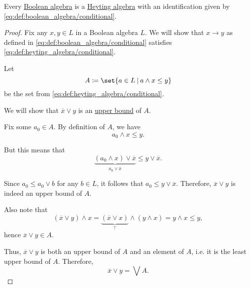 \begin{proposition}\label{thm:boolean_algebras_are_heyting_algebras}
  Every \hyperref[def:boolean_algebra]{Boolean algebra} is a \hyperref[def:heyting_algebra]{Heyting algebra} with an identification given by \eqref{eq:def:boolean_algebra/conditional}.
\end{proposition}
\begin{proof}
  Fix any \( x, y \in L \) in a Boolean algebra \( L \). We will show that \( x \rightarrow y \) as defined in \eqref{eq:def:boolean_algebra/conditional} satisfies \eqref{eq:def:heyting_algebra/conditional}.

  Let
  \begin{equation*}
   A \coloneqq \set{ a \in L \given a \wedge x \leq y }
  \end{equation*}
  be the set from \eqref{eq:def:heyting_algebra/conditional}.

  We will show that \( \overline x \vee y \) is an \hyperref[def:extremal_points/upper_and_lower_bounds]{upper bound} of \( A \).

  Fix some \( a_0 \in A \). By definition of \( A \), we have
  \begin{equation*}
   a_0 \wedge x \leq y.
  \end{equation*}

  But this means that
  \begin{equation*}
   \underbrace{(a_0 \wedge x) \vee \overline x}_{a_0 \vee \overline x} \leq y \vee \overline x.
  \end{equation*}

  Since \( a_0 \leq a_0 \vee b \) for any \( b \in L \), it follows that \( a_0 \leq y \vee \overline x \). Therefore, \( \overline x \vee y \) is indeed an upper bound of \( A \).

  Also note that
  \begin{equation*}
   (\overline x \vee y) \wedge x = \underbrace{(\overline x \vee x)}_{\top} \wedge (y \wedge x) = y \wedge x \leq y,
  \end{equation*}
  hence \( \overline x \vee y \in A \).

  Thus, \( \overline x \vee y \) is both an upper bound of \( A \) and an element of \( A \), i.e. it is the least upper bound of \( A \). Therefore,
  \begin{equation*}
   \overline x \vee y = \bigvee A.
  \end{equation*}
\end{proof}

